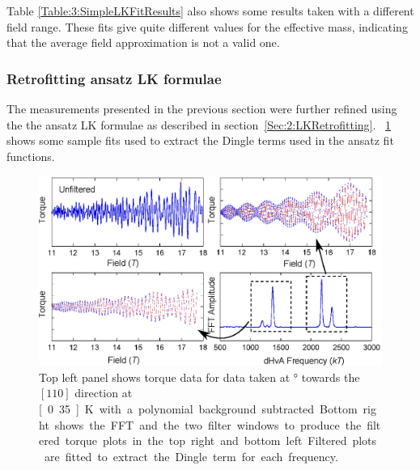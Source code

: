 Table \ref{Table:3:SimpleLKFitResults} also shows some results taken with a different field range. These fits give quite different values for the effective mass, indicating that the average field approximation is not a valid one.

\subsubsection{Retrofitting ansatz LK formulae}

The measurements presented in the previous section were further refined using the the ansatz LK formulae as described in section~\ref{Sec:2:LKRetrofitting}. \Fig~\ref{Fig:3:DingleTermExtractionFits} shows some sample fits used to extract the Dingle terms used in the ansatz fit functions.
\begin{figure}[h!]
    \begin{center}
        \includegraphics[scale=0.9]{Chapter3-dHvABaFe2P2/Figures/Mass/FittingDingleTerm/FittingDingleTerm}
        \caption{Top left panel shows torque data for data taken at \unit[12]{\degree} towards the $[110]$ direction at \unit[0.35]{K} with a polynomial background subtracted. Bottom right shows the FFT and the two filter windows to produce the filtered torque plots in the top right and bottom left. Filtered plots are fitted to extract the Dingle term for each frequency.}
        \label{Fig:3:DingleTermExtractionFits}
    \end{center}
\end{figure}

